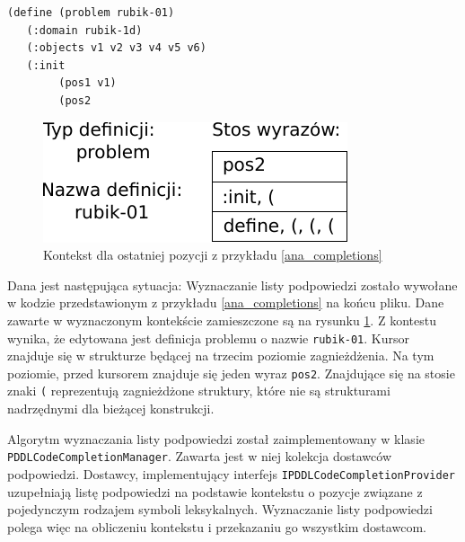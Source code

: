 \begin{Code}
\begin{lstlisting}[language=LISP,frame=single,label=ana_completions, caption=Edytowany kod PDDL]
(define (problem rubik-01)
   (:domain rubik-1d)
   (:objects v1 v2 v3 v4 v5 v6)
   (:init
        (pos1 v1)
        (pos2 
\end{lstlisting}
\end{Code}

\begin{figure}[h]
  \centering
    \includegraphics{img/ana_completion.pdf}
    \caption{Kontekst dla ostatniej pozycji z przykładu \ref{ana_completions}}
    \label{ana_context}
\end{figure}


Dana jest następująca sytuacja: Wyznaczanie listy podpowiedzi zostało wywołane w kodzie przedstawionym
z przykładu \ref{ana_completions} na końcu pliku. Dane zawarte w wyznaczonym kontekście zamieszczone
są na rysunku \ref{ana_context}. Z kontestu wynika, że edytowana jest definicja problemu o nazwie
\texttt{rubik-01}. Kursor znajduje się w strukturze będącej na trzecim poziomie zagnieżdżenia.
 Na tym poziomie,
przed kursorem znajduje się jeden wyraz \texttt{pos2}. Znajdujące się na stosie znaki \texttt{(} 
reprezentują zagnieżdżone struktury, które nie są strukturami nadrzędnymi dla bieżącej konstrukcji.

\begin{sloppypar}
Algorytm wyznaczania listy podpowiedzi został zaimplementowany w klasie \texttt{PDDLCodeCompletionManager}.
Zawarta jest w niej kolekcja dostawców podpowiedzi. Dostawcy, implementujący interfejs
\texttt{IPDDLCodeCompletionProvider} uzupełniają listę podpowiedzi na podstawie kontekstu 
o pozycje związane z pojedynczym rodzajem symboli leksykalnych. Wyznaczanie listy podpowiedzi polega 
więc na obliczeniu kontekstu i przekazaniu go wszystkim dostawcom.
\end{sloppypar}

